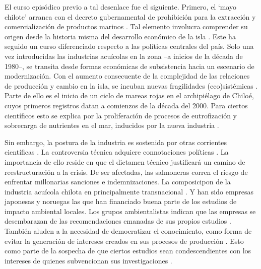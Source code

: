 \documentclass{textolivre}
\begin{document}
El curso episódico previo a tal desenlace fue el siguiente. Primero, el ‘mayo chilote’
arranca con el decreto gubernamental de prohibición para la extracción y comercialización
de productos marinos \cite{burrows2016}. Tal elemento involucra comprender su origen
desde la historia misma del desarrollo económico de la isla \cite{roman2016}. Este ha
seguido un curso diferenciado respecto a las políticas centrales del país. Solo una vez
introducidas las industrias acuícolas en la zona --a inicios de la década de 1980--, se
transita desde formas económicas de subsistencia hacia un escenario de modernización.
Con el aumento consecuente de la complejidad de las relaciones de producción y cambio
en la isla, se incuban nuevas fragilidades (eco)sistémicas \cite{Mascareo2018,solimano}. 
Parte de ello es el inicio de un ciclo de mareas rojas en el archipiélago
de Chiloé, cuyos primeros registros datan a comienzos de la década del 2000. Para
ciertos científicos esto se explica por la proliferación de procesos de eutrofización y
sobrecarga de nutrientes en el mar, inducidos por la nueva industria \cite{Kamjunke2017,desconcierto}.

Sin embargo, la postura de la industria es sostenida por otras corrientes científicas
\cite{buschmann2016}. La controversia técnica adquiere connotaciones políticas
\cite{cnnchile2016a}. La importancia de ello reside en que el dictamen técnico justificará
un camino de reestructuración a la crisis. De ser afectadas, las salmoneras corren el
riesgo de enfrentar millonarias sanciones e indemnizaciones. La composicipon de la
industria acuícola chilota en principalmente transnacional \cite{roman2016}. Y han
sido empresas japonesas y noruegas las que han financiado buena parte de los estudios
de impacto ambiental locales. Los grupos ambientalistas indican que las empresas se
desembarazan de las recomendaciones emanadas de sus propios estudios \cite{ciudadano2016}. 
También aluden a la necesidad de democratizar el conocimiento,
como forma de evitar la generación de intereses creados en sus procesos de producción
\cite{Gunderson2019}. Esto como parte de la sospecha de que
ciertos estudios sean condescendientes con los intereses de quienes subvencionan sus
investigaciones \cite{tercera}.
\end{document}
